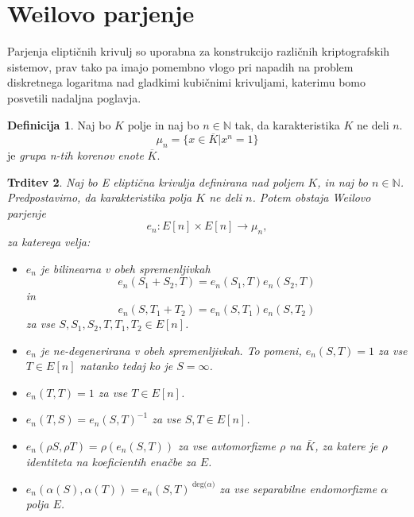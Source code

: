 \documentclass[12pt,a4paper,twoside]{article}
\theoremstyle{definition} %
\newtheorem{definicija}{Definicija}[section]
\theoremstyle{plain} %
\newtheorem{trditev}[definicija]{Trditev}
\numberwithin{equation}{section}  %
\newcommand{\N}{\mathbb N}
\newcommand{\DEG}[1]{\ \text{deg(}{#1}\text{)}}
\begin{document}
\newpage
\section{Weilovo parjenje}
Parjenja eliptičnih krivulj \cite{Washington2008} so uporabna za konstrukcijo različnih kriptografskih sistemov, prav tako pa imajo pomembno vlogo pri napadih na problem diskretnega logaritma nad
gladkimi kubičnimi krivuljami, katerimu bomo posvetili nadaljna poglavja.

\begin{definicija}
Naj bo $K$ polje in naj bo $n \in \N$ tak, da karakteristika $K$ ne deli $n$.
$$\mu_n = \{ x \in \overline{K} | x^n = 1 \}$$
je \emph{grupa n-tih korenov enote} $\overline{K}$.
\end{definicija}

\begin{trditev}
\label{trd-WeilPar}
Naj bo E eliptična krivulja definirana nad poljem $K$, in naj bo $n \in \N$. Predpostavimo, da karakteristika polja $K$ ne deli $n$. Potem obstaja Weilovo parjenje
$$e_n:E[n] \times E[n] \rightarrow \mu_n,$$
za katerega velja:
\begin{itemize}
\item $e_n$ je bilinearna v obeh spremenljivkah
$$e_n(S_1+S_2,T) = e_n(S_1,T)e_n(S_2,T)$$
in
$$e_n(S,T_1+T_2) = e_n(S,T_1)e_n(S,T_2)$$
za vse $S,S_1,S_2,T,T_1,T_2 \in E[n]$.
\item $e_n$ je ne-degenerirana v obeh spremenljivkah. To pomeni, $e_n(S,T) = 1$ za vse $T \in E[n]$ natanko tedaj ko je $S = \infty$.

\item $e_n(T,T) = 1$ za vse $T \in E[n]$.

\item $e_n(T,S) = e_n(S,T)^{-1}$ za vse $S,T \in E[n]$.

\item $e_n(\rho S,\rho T) = \rho(e_n(S,T))$ za vse avtomorfizme $\rho$ na $\bar{K}$, za katere je $\rho$ identiteta na koeficientih enačbe za $E$.

\item $e_n(\alpha(S),\alpha(T)) = e_n(S,T)^{\DEG{\alpha}}$ za vse separabilne endomorfizme $\alpha$ polja $E$.
\end{itemize}

\end{trditev}
\end{document}
